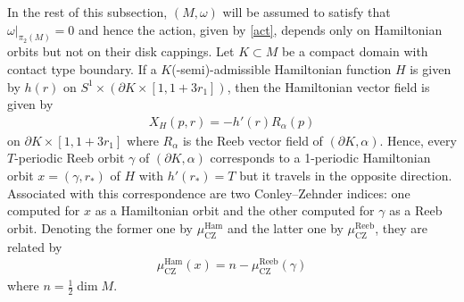 \documentclass[12pt]{amsart}
\theoremstyle{definition}
\begin{document}
\vspace{0.2 cm}

In the rest of this subsection, $(M, \omega)$ will be assumed to satisfy that $\omega|_{\pi_2(M)} = 0$ and hence the action, given by \eqref{act}, depends only on Hamiltonian orbits but not on their disk cappings. Let $K \subset M$ be a compact domain with contact type boundary. If a $K$(-semi)-admissible Hamiltonian function $H$ is given by $h(r)$ on $S^1 \times( {\partial K} \times[1, 1+3r_1])$, then the Hamiltonian vector field is given by
\begin{align*}
  X_H(p, r) = -h'(r) R_\alpha(p)  
\end{align*}
on $\partial K \times [1,1+3r_1]$ where $R_\alpha$ is the Reeb vector field of $(\partial K, \alpha)$. Hence, every $T$-periodic Reeb orbit $\gamma$ of $(\partial K, \alpha)$ corresponds to a 1-periodic Hamiltonian orbit $x = (\gamma, r_*)$ of $H$ with $h'(r_*) = T$ but it travels in the opposite direction. Associated with this correspondence are two Conley–Zehnder indices: one computed for $x$ as a Hamiltonian orbit and the other computed for $\gamma$ as a Reeb orbit. Denoting the former one by $\mu_{\textrm{CZ}}^{\textrm{Ham}}$ and the latter one by $\mu_{\textrm{CZ}}^{\textrm{Reeb}}$, they are related by 
\begin{align}\label{indexcomp}
    \mu_{\textrm{CZ}}^{\textrm{Ham}}(x) = n - \mu_{\textrm{CZ}}^{\textrm{Reeb}}(\gamma)
\end{align}
where $n = \frac{1}{2} \dim M$.
\vspace{0.2 cm}
\end{document}
